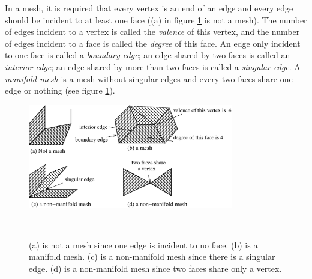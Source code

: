 \documentclass[11pt, a4paper]{report}
\begin{document}
    In a mesh, it is required that every
    vertex is an end of an edge and every edge should be incident to at
    least one face ((a) in figure \ref{mesh_non_mesh} is not a mesh).
    The number of edges incident to a vertex is called the
    \emph{valence} of this vertex, and the number of edges incident to
    a face is called the \emph{degree} of this face. An edge only
    incident to one face is called a \emph{boundary edge}; an edge
    shared by two faces is called an \emph{interior edge}; an edge
    shared by more than two faces is called a \emph{singular edge}. A
    \emph{manifold mesh} is a mesh without singular edges and every
    two faces share one edge or nothing (see figure \ref{mesh_non_mesh}).
\begin{figure}
\centering
\includegraphics[width=0.8\textwidth]{figure2.1.eps}
\caption[Manifold mesh, non-manifold mesh and non-mesh]{ (a) is not
a mesh since one edge is incident to no face. (b) is a manifold
mesh. (c) is a non-manifold mesh since there is a singular edge.
(d) is a non-manifold mesh since two faces share only a
vertex.\label{mesh_non_mesh}}\
\end{figure}
\end{document}
